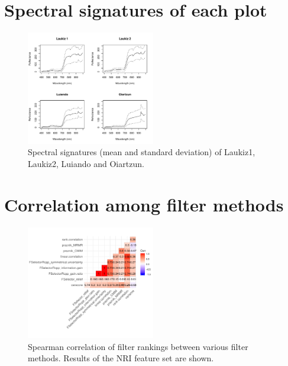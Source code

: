 \documentclass[letterpaper, journal]{IEEEtran}
\begin{document}
\appendices

\section{Spectral signatures of each plot}

\begin{figure} [h]
\begin{center}
\includegraphics[width=0.5\textwidth] {spectral-signatures-1.pdf}
\caption{Spectral signatures (mean and standard deviation) of Laukiz1, Laukiz2, Luiando and Oiartzun.}
\label{fig:spectral-signatures}
\end{center}
\end{figure}

\pagebreak

\section{Correlation among filter methods}

\begin{figure} [h]
\begin{center}
\includegraphics[width=0.5\textwidth] {correlation-filter-nri-1.pdf}
\caption{Spearman correlation of filter rankings between various filter methods. Results of the NRI feature set are shown.}
\label{fig:correlation-filters}
\end{center}
\end{figure}
\end{document}
